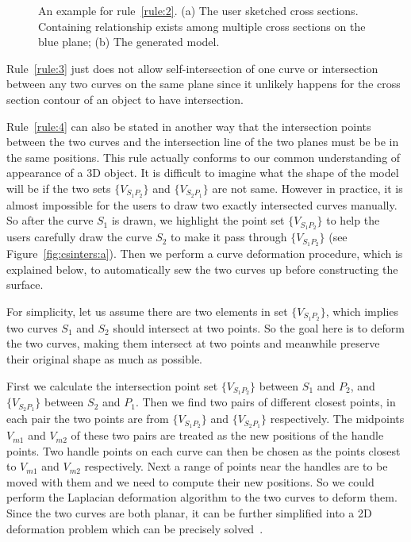 \begin{figure} [htbp]
{\begin{minipage}[b]{0.22\textwidth}
    \end{minipage}}
  \caption{An example for rule~\ref{rule:2}. (a) The user sketched cross sections. Containing relationship exists among multiple cross sections on the blue plane; (b) The generated model.}
  \label{fig:rule2} %
\end{figure}

Rule~\ref{rule:3} just does not allow self-intersection of one
curve or intersection between any two curves on the same plane since
it unlikely happens for the cross section contour of an object to
have intersection.

Rule~\ref{rule:4} can also be stated in another way that the
intersection points between the two curves and the intersection line
of the two planes must be be in the same positions. This rule
actually conforms to our common understanding of appearance of a 3D
object. It is difficult to imagine what the shape of the model will
be if the two sets $\{V_{S_1P_2}\}$ and $\{V_{S_2P_1}\}$ are not
same. However in practice, it is almost impossible for the users to
draw two exactly intersected curves manually. So after the curve
$S_1$ is drawn, we highlight the point set $\{V_{S_1P_2}\}$ to help
the users carefully draw the curve $S_2$ to make it pass through
$\{V_{S_1P_2}\}$ (see Figure~\ref{fig:csinters:a}). Then we perform
a curve deformation procedure, which is explained below, to
automatically sew the two curves up before constructing the surface.

For simplicity, let us assume there are two elements  in set
$\{V_{S_1P_2}\}$, which implies two curves $S_1$ and $S_2$ should
intersect at two points. So the goal here is to deform the two
curves, making them intersect at two points and meanwhile preserve
their original shape as much as possible.

First we calculate the intersection point set  $\{V_{S_1P_2}\}$
between $S_1$ and $P_2$, and $\{V_{S_2P_1}\}$ between $S_2$ and
$P_1$. Then we find two pairs of different closest points, in each
pair the two points are from $\{V_{S_1P_2}\}$ and $\{V_{S_2P_1}\}$
respectively. The midpoints $V_{m1}$ and $V_{m2}$ of these two pairs
are treated as the new positions of the handle points. Two handle
points on each curve can then be chosen as the points closest to
$V_{m1}$ and $V_{m2}$ respectively. Next a range of points near the
handles are to be moved with them and we need to compute their new
positions. So we could perform the Laplacian deformation algorithm
to the two curves to deform them. Since the two curves are both
planar, it can be further simplified into a 2D deformation problem
which can be precisely solved~\cite{ESA07}.

